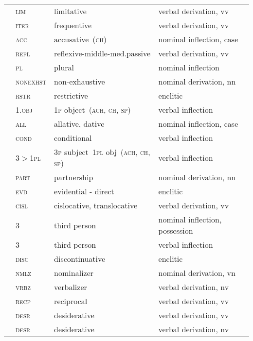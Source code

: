 \begin{refsection}
\begin{small}
\begin{longtable}{*{4}{@{\hspace{0.75ex}}l}@{\hspace{0ex}}}
 	& \textsc{lim} 	& limitative 	& verbal derivation, vv\\
 		& \textsc{iter} 		& frequentive 	& verbal derivation, vv\\
 		& \textsc{acc} 	& accusative~(\textsc{ch}) 	& nominal inflection, case\\
 		& \textsc{refl} 		& reflexive-middle-med.passive 	& verbal derivation, vv\\
	& \textsc{pl} 	& plural 	& nominal inflection\\
	& \textsc{nonexhst} 	& non-exhaustive 	& nominal derivation, nn\\
 		& \textsc{rstr} 		& restrictive 	& enclitic\\
		& \textsc{1.obj} 	& 1\textsc{p} object~(\textsc{ach}, \textsc{ch}, \textsc{sp}) 	& verbal inflection \\
 	& \textsc{all} 		& allative, dative 	& nominal inflection, case\\
 	& \textsc{cond} 		& conditional 	& verbal inflection\\
 	& 3$>$1\textsc{pl}& 3\textsc{p} subject~1\textsc{pl} obj~(\textsc{ach}, \textsc{ch}, \textsc{sp}) & verbal inflection \\
 		& \textsc{part} 		& partnership 	& nominal derivation, nn\\
 		& \textsc{evd} 		& evidential - direct 	& enclitic\\
 		& \textsc{cisl} 		& cislocative, translocative 	& verbal derivation, vv\\
		& 3 	& third person 	& nominal inflection, possession\\
		& 3 	& third person 	& verbal inflection\\
 		& \textsc{disc} 		& discontinuative 	& enclitic\\
 	& \textsc{nmlz} 		& nominalizer 	& nominal derivation, vn\\
	& \textsc{vrbz} 		& verbalizer 	& verbal derivation, nv\\
 		& \textsc{recp} 		& reciprocal 	& verbal derivation, vv\\
 		& \textsc{desr} 		& desiderative 	& verbal derivation, vv\\
 		& \textsc{desr} 		& desiderative 	& verbal derivation, nv\\

\end{longtable}
\end{small}
\end{refsection}
